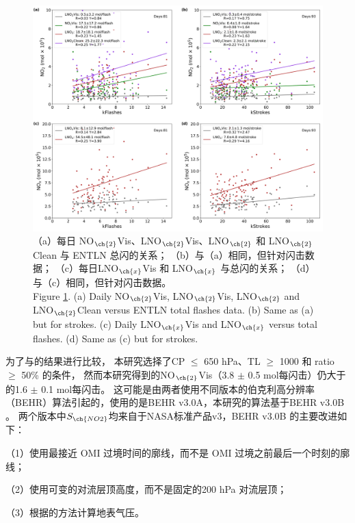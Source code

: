 \begin{figure}[H]
\centering
\includegraphics[width=\textwidth]{./figures/us_pe_linear.png}
\caption{（a）每日 NO$_{\ch{2}}$Vis、LNO$_{\ch{2}}$Vis、LNO$_{\ch{2}}$ 和 LNO$_{\ch{2}}$Clean 与 ENTLN 总闪的关系；
（b）与（a）相同，但针对闪击数据；
（c）每日LNO$_{\ch{x}}$Vis 和 LNO$_{\ch{x}}$ 与总闪的关系；
（d）与（c）相同，但针对闪击数据。\\
Figure \ref{fig:us_pe_linear}.
(a) Daily NO$_{\ch{2}}$Vis, LNO$_{\ch{2}}$Vis, LNO$_{\ch{2}}$ and LNO$_{\ch{2}}$Clean versus ENTLN total flashes data.
(b) Same as (a) but for strokes.
(c) Daily LNO$_{\ch{x}}$Vis and LNO$_{\ch{x}}$ versus total flashes.
(d) Same as (c) but for strokes.}
\label{fig:us_pe_linear}
\end{figure}


为了与\citet{Lapierre.2020}的结果进行比较，
本研究选择了CP $\leq$ 650 hPa、TL $\geq$ 1000 和 ratio $\geq$ 50\% 的条件，
然而本研究得到的NO$_{\ch{2}}$Vis（3.8 $\pm$ 0.5 mol每闪击）仍大于\citet{Lapierre.2020}的1.6 $\pm$ 0.1 mol每闪击。
这可能是由两者使用不同版本的伯克利高分辨率（BEHR）算法引起的，\citet{Lapierre.2020}使用的是BEHR v3.0A，本研究的算法基于BEHR v3.0B \citep{Laughner.2019a}。
两个版本中$S_{\ch{NO2}}$均来自于NASA标准产品v3，BEHR v3.0B 的主要改进如下：

（1）使用最接近 OMI 过境时间的廓线，而不是 OMI 过境之前最后一个时刻的廓线；

（2）使用可变的对流层顶高度，而不是固定的200 hPa 对流层顶；

（3）根据\citet{Zhou.2009}的方法计算地表气压。


